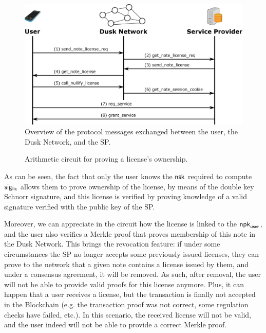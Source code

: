 \begin{figure}[h]
	\centering
		\includegraphics[width=390pt,draft=false]{images/protocol.eps}
	\caption{Overview of the protocol messages exchanged between the user, the Dusk Network, and the SP.}
	\label{fig:protocol}
\end{figure}

\begin{figure}[h]
	\centering
	\setlength{\fboxsep}{5pt}%
	\setlength{\fboxrule}{0.3pt}%
	\caption{Arithmetic circuit for proving a license's ownership.}
	\label{fig:circuit_prove_nft}
\end{figure}

As can be seen, the fact that only the user knows the $\mathsf{nsk}$ required to compute $\mathsf{sig_{lic}}$ allows them to prove ownership of the license, by means of the double key Schnorr signature, and this license is verified by proving knowledge of a valid signature verified with the public key of the SP. 

Moreover, we can appreciate in the circuit how the license is linked to the $\mathsf{npk}_{\mathsf{user}}$, and the user also verifies a Merkle proof that proves membership of this note in the Dusk Network. This brings the revocation feature: if under some circumstances the SP no longer accepts some previously issued licenses, they can prove to the network that a given note contains a license issued by them, and under a consensus agreement, it will be removed. As such, after removal, the user will not be able to provide valid proofs for this license anymore. Plus, it can happen that a user receives a license, but the transaction is finally not accepted in the Blockchain (e.g. the transaction proof was not correct, some regulation checks have failed, etc.). In this scenario, the received license will not be valid, and the user indeed will not be able to provide a correct Merkle proof.

